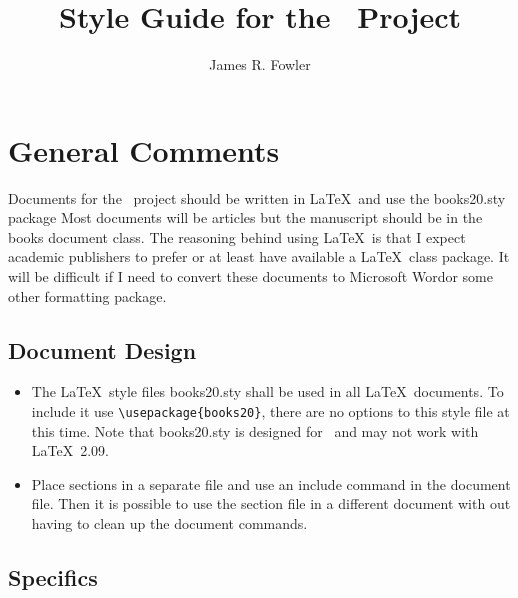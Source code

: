 \documentclass{article}
\begin{document}
\title{Style Guide for the \PTitle\ Project}
\author{James R. Fowler}

\maketitle

\section{General Comments}

Documents for the \PTitle\ project should be written in \LaTeX\ and use
the books20.sty package Most documents will be articles but the
manuscript should be in the books document class. The reasoning behind
using \LaTeX\ is that I expect academic publishers to prefer or at
least have available a \LaTeX\ class package.  It will be difficult if
I need to convert these documents to Microsoft Word\texttrademark or
some other formatting package.

\subsection{Document Design}

\begin{itemize}
  
\item The \LaTeX\ style files books20.sty shall be used in all
  \LaTeX\ documents. To include it use \verb|\usepackage{books20}|, there
  are no options to this style file at this time. Note that books20.sty
  is designed for \LaTeXe\ and may not work with \LaTeX\ 2.09.
  

\item Place sections in a separate file and use an include command in the
  document file. Then it is possible to use the section file in a
  different document with out having to clean up the document commands.

\end{itemize}

\subsection{Specifics}
\end{document}
